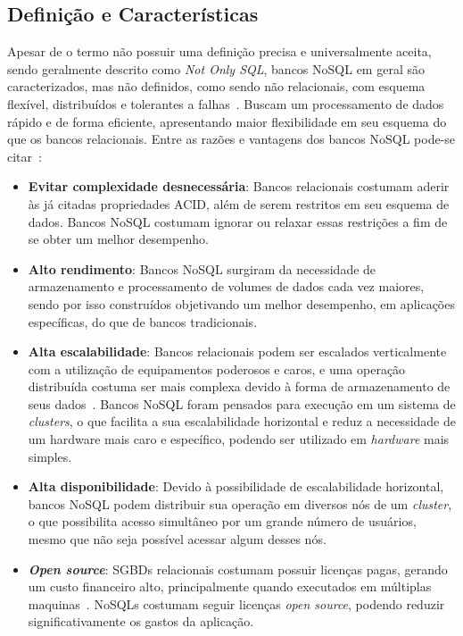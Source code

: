\subsection{Definição e Características}
Apesar de o termo não possuir uma definição precisa e universalmente aceita, sendo geralmente descrito como \emph{Not Only SQL}, bancos NoSQL em geral são caracterizados, mas não definidos, como sendo não relacionais, com esquema flexível, distribuídos e tolerantes a falhas~\cite{pramod}. Buscam um processamento de dados rápido e de forma eficiente, apresentando maior flexibilidade em seu esquema do que os bancos relacionais.
Entre as razões e vantagens dos bancos NoSQL pode-se citar~\cite{chrisnosql}:
\begin{itemize}
	\item \textbf{Evitar complexidade desnecessária}: Bancos relacionais costumam aderir às já citadas propriedades ACID, além de serem restritos em seu esquema de dados. Bancos NoSQL costumam ignorar ou relaxar essas restrições a fim de se obter um melhor desempenho.
	
	\item \textbf{Alto rendimento}: Bancos NoSQL surgiram da necessidade de armazenamento e processamento de volumes de dados cada vez maiores, sendo por isso construídos objetivando um melhor desempenho, em aplicações específicas, do que de bancos tradicionais.
	
	\item \textbf{Alta escalabilidade}: Bancos relacionais podem ser escalados verticalmente com a utilização de equipamentos poderosos e caros, e uma operação distribuída costuma ser mais complexa devido à forma de armazenamento de seus dados~\cite{leavitt2010nosql}. Bancos NoSQL foram pensados para execução em um sistema de \emph{clusters}, o que facilita a sua escalabilidade horizontal e reduz a necessidade de um hardware mais caro e específico, podendo ser utilizado em \emph{hardware} mais simples. 
	
	\item \textbf{Alta disponibilidade}: Devido à possibilidade de escalabilidade horizontal, bancos NoSQL podem distribuir sua operação em diversos nós de um \emph{cluster}, o que possibilita acesso simultâneo por um grande número de usuários, mesmo que não seja possível acessar algum desses nós. 
	
	\item \textbf{\emph{Open source}}: SGBDs relacionais costumam possuir licenças pagas, gerando um custo financeiro alto, principalmente quando executados em múltiplas maquinas~\cite{pramod}. NoSQLs costumam seguir licenças \emph{open source}, podendo reduzir significativamente os gastos da aplicação. 
\end{itemize}

